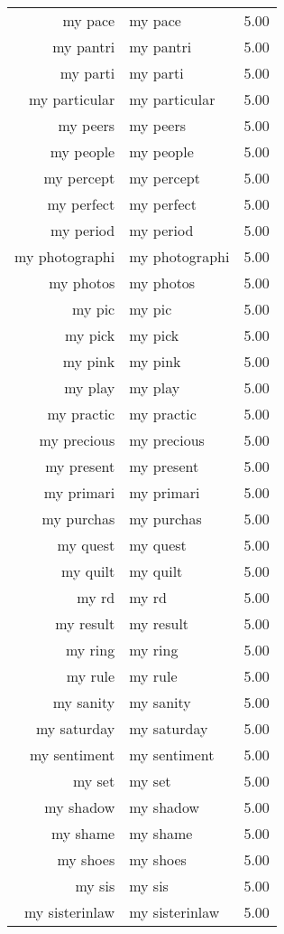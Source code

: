 \begin{table}[ht]
\begin{tabular}{rlr}
  my pace & my pace & 5.00 \\ 
  my pantri & my pantri & 5.00 \\ 
  my parti & my parti & 5.00 \\ 
  my particular & my particular & 5.00 \\ 
  my peers & my peers & 5.00 \\ 
  my people & my people & 5.00 \\ 
  my percept & my percept & 5.00 \\ 
  my perfect & my perfect & 5.00 \\ 
  my period & my period & 5.00 \\ 
  my photographi & my photographi & 5.00 \\ 
  my photos & my photos & 5.00 \\ 
  my pic & my pic & 5.00 \\ 
  my pick & my pick & 5.00 \\ 
  my pink & my pink & 5.00 \\ 
  my play & my play & 5.00 \\ 
  my practic & my practic & 5.00 \\ 
  my precious & my precious & 5.00 \\ 
  my present & my present & 5.00 \\ 
  my primari & my primari & 5.00 \\ 
  my purchas & my purchas & 5.00 \\ 
  my quest & my quest & 5.00 \\ 
  my quilt & my quilt & 5.00 \\ 
  my rd & my rd & 5.00 \\ 
  my result & my result & 5.00 \\ 
  my ring & my ring & 5.00 \\ 
  my rule & my rule & 5.00 \\ 
  my sanity & my sanity & 5.00 \\ 
  my saturday & my saturday & 5.00 \\ 
  my sentiment & my sentiment & 5.00 \\ 
  my set & my set & 5.00 \\ 
  my shadow & my shadow & 5.00 \\ 
  my shame & my shame & 5.00 \\ 
  my shoes & my shoes & 5.00 \\ 
  my sis & my sis & 5.00 \\ 
  my sisterinlaw & my sisterinlaw & 5.00 \\ 

\end{tabular}
\end{table}
